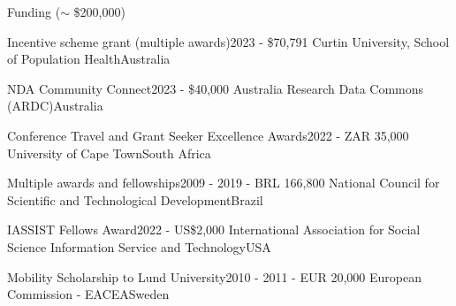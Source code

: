 \begin{rSection}{Funding ($\sim$ \$200,000)}

\begin{rSubsection}
{Incentive scheme grant (multiple awards)}{2023 - \$70,791}
{Curtin University, School of Population Health}{Australia}\par
\end{rSubsection}

\begin{rSubsection}
{NDA Community Connect}{2023 - \$40,000}
{Australia Research Data Commons (ARDC)}{Australia}\par
\end{rSubsection}

\begin{rSubsection}
{Conference Travel and Grant Seeker Excellence Awards}{2022 - ZAR 35,000}
{University of Cape Town}{South Africa}\par
\end{rSubsection}

\begin{rSubsection}
{Multiple awards and fellowships}{2009 - 2019 - BRL 166,800}
{National Council for Scientific and Technological Development}{Brazil}\par
\end{rSubsection}

\begin{rSubsection}
{IASSIST Fellows Award}{2022 - US\$2,000}
{International Association for Social Science Information Service and Technology}{USA}\par
\end{rSubsection}

\begin{rSubsection}
{Mobility Scholarship to Lund University}{2010 - 2011 - EUR 20,000}
{European Commission - EACEA}{Sweden}\par
\end{rSubsection}

\end{rSection}